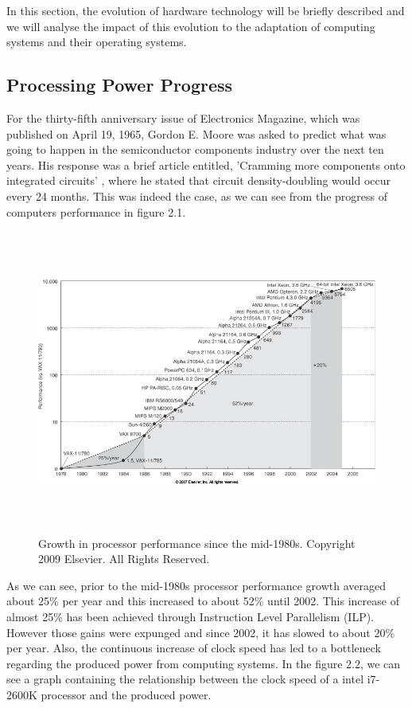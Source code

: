 \documentclass[diploma]{Styles/softlab-thesis}
\begin{document}
In this section, the evolution of hardware technology will be briefly described and we will analyse the impact of this evolution to the adaptation of computing systems and their operating systems.

\subsection{Processing Power Progress}

For the thirty-fifth anniversary issue of Electronics Magazine, which was published on April 19, 1965, Gordon E. Moore was asked to predict what was going to happen in the semiconductor components industry over the next ten years. His response was a brief article entitled, 'Cramming more components onto integrated circuits'  \cite{reference18}, where he stated that circuit density-doubling would occur every 24 months. This was indeed the case, as we can see from the progress of computers performance in figure 2.1.

\begin{figure}[ht!]
\begin{center}
\includegraphics[width=160mm, height=100mm]{images/computing-power-patterson.jpg}
\caption{Growth in processor performance since the mid-1980s. Copyright 2009 Elsevier. All Rights Reserved. \label{overflow}}
\end{center}
\end{figure}

As we can see, prior to the mid-1980s processor performance growth averaged about 25\% per year and this increased to about 52\% until 2002. This increase of almost 25\% has been achieved through Instruction Level Parallelism (ILP). However those gains were expunged and since 2002, it has slowed to about 20\% per year. Also, the continuous increase of clock speed has led to a bottleneck regarding the produced power from computing systems. In the figure 2.2, we can see a graph containing the relationship between the clock speed of a intel i7-2600K processor and the produced power.
\end{document}
